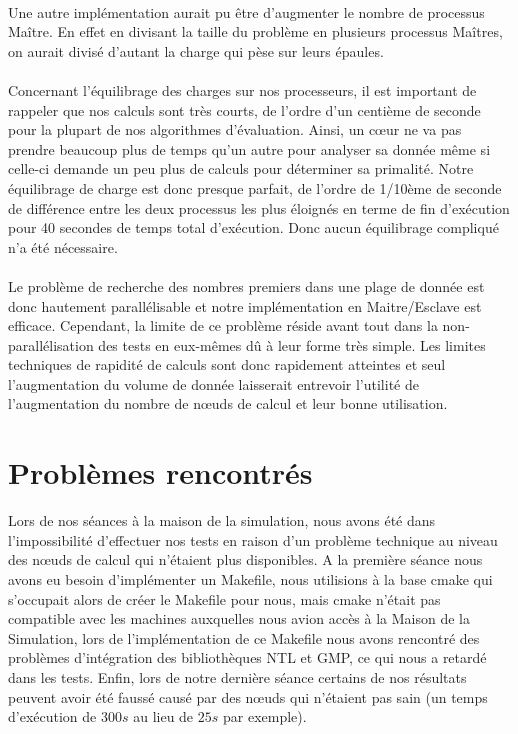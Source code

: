 \paragraph{}Une autre implémentation aurait pu être d'augmenter le nombre de processus Maître. En effet en divisant la taille du problème en plusieurs processus Maîtres, on aurait divisé d'autant la charge qui pèse sur leurs épaules.

\paragraph{}Concernant l'équilibrage des charges sur nos processeurs, il est important de rappeler que nos calculs sont très courts, de l'ordre d'un centième de seconde pour la plupart de nos algorithmes d'évaluation.
Ainsi, un cœur ne va pas prendre beaucoup plus de temps qu'un autre pour analyser sa donnée même si celle-ci demande un peu plus de calculs pour déterminer sa primalité.
Notre équilibrage de charge est donc presque parfait, de l'ordre de 1/10ème de seconde de différence entre les deux processus les plus éloignés en terme de fin d’exécution pour 40 secondes de temps total d’exécution. Donc aucun équilibrage compliqué n'a été nécessaire.

\paragraph{}Le problème de recherche des nombres premiers dans une plage de donnée est donc hautement parallélisable et notre implémentation en Maitre/Esclave est efficace. Cependant, la limite de ce problème réside avant tout dans la non-parallélisation des tests en eux-mêmes dû à leur forme très simple.
Les limites techniques de rapidité de calculs sont donc rapidement atteintes et seul l'augmentation du volume de donnée laisserait entrevoir l'utilité de l'augmentation du nombre de nœuds de calcul et leur bonne utilisation.		
		
	\section{Problèmes rencontrés}
	Lors de nos séances à la maison de la simulation, nous avons été dans l'impossibilité d'effectuer nos tests en raison d'un problème technique au niveau des nœuds de calcul qui n'étaient plus disponibles.
	A la première séance nous avons eu besoin d'implémenter un Makefile, nous utilisions à la base cmake qui s'occupait alors de créer le Makefile pour nous, mais cmake n'était pas compatible avec les machines auxquelles nous avion accès à la Maison de la Simulation, lors de l'implémentation de ce Makefile nous avons rencontré des problèmes d'intégration des bibliothèques NTL et GMP, ce qui nous a retardé dans les tests.
	Enfin, lors de notre dernière séance certains de nos résultats peuvent avoir été faussé causé par des nœuds qui n'étaient pas sain (un temps d'exécution de $300s$ au lieu de $25s$ par exemple).
					
